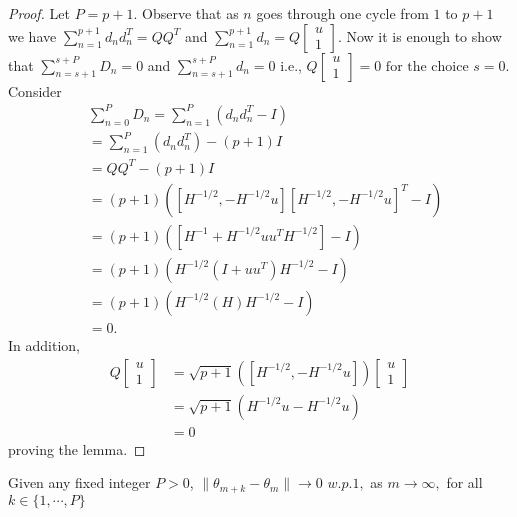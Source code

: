 \begin{proof}
 Let $P=p+1$. Observe that as $n$ goes through one cycle from $1$ to $p+1$ we have
 $\sum\limits_{n=1}^{p+1}d_nd_n^T=QQ^T$ and 
 $\sum\limits_{n=1}^{p+1}d_n= Q\left[\begin{array}{cccc}
 u\\ 1 \end{array}\right]$.
 Now it is enough to show that
 $\sum\limits_{n=s+1}^{s+P}D_n=0$ and 
 $\sum\limits_{n=s+1}^{s+P}d_n= 0$ i.e., 
 $Q\left[\begin{array}{cccc}
 u\\ 1 \end{array}\right]=0 \text{ for the choice } s=0.$
 Consider
 \begin{align*}
 & \sum_{n=0}^{P}D_n=\sum_{n=1}^{P}(d_nd_n^T-I)\\
 & =\sum_{n=1}^{P}(d_nd_n^T)-(p+1)I\\
 & =QQ^T-(p+1)I\\
 & =(p+1)([H^{-1/2},-H^{-1/2}u][H^{-1/2},-H^{-1/2}u]^T-I)\\
 & =(p+1)([H^{-1}+H^{-1/2}uu^TH^{-1/2}]-I)\\
 & =(p+1)(H^{-1/2}(I+uu^T)H^{-1/2}-I)\\
 & =(p+1)(H^{-1/2}(H)H^{-1/2}-I)\\
 & = 0.
 \end{align*}
 In addition,
 \begin{align*}
 Q\left[\begin{array}{cccc}
 u\\ 1 \end{array}\right]
 & = \sqrt{p+1}([H^{-1/2},-H^{-1/2}u]) \left[\begin{array}{cccc}
 u\\ 1 \end{array}\right]\\
 & = \sqrt{p+1}(H^{-1/2}u-H^{-1/2}u)\\
 & = 0
 \end{align*}
proving the lemma.
\end{proof}
\begin{lemma}
 Given any fixed integer $P>0$, $\|\theta_{m+k}-\theta_{m}\| \rightarrow 0$ $w.p.1,$ as
 $m \rightarrow \infty,$ for all $k \in \{1,\cdots, P\}$
\end{lemma}
